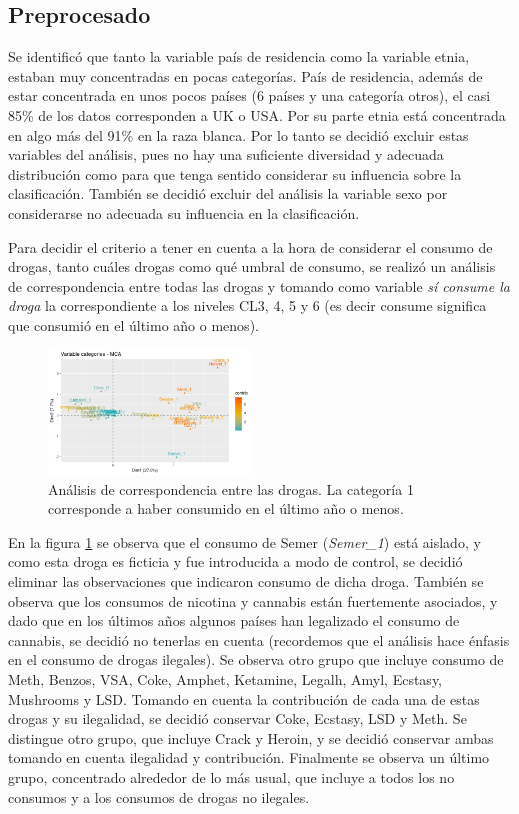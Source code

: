 \documentclass[a4paper,twocolumn]{article}
\begin{document}
\subsection{Preprocesado}
Se identificó que tanto la variable país de residencia como la variable etnia, estaban muy concentradas en pocas categorías. País de residencia, además de estar concentrada en unos pocos países (6 países y una categoría otros), el casi 85\% de los datos corresponden a UK o USA. Por su parte etnia está concentrada en algo más del 91\% en la raza blanca. Por lo tanto se decidió excluir estas variables del análisis, pues no hay una suficiente diversidad y adecuada distribución como para que tenga sentido considerar su influencia sobre la clasificación. También se decidió excluir del análisis la variable sexo por considerarse no adecuada su influencia en la clasificación.

Para decidir el criterio a tener en cuenta a la hora de considerar el consumo de drogas, tanto cuáles drogas como qué umbral de consumo, se realizó un análisis de correspondencia entre todas las drogas y tomando como variable \emph{sí consume la droga} la correspondiente a los niveles CL3, 4, 5 y 6 (es decir consume significa que consumió en el último año o menos).

\begin{figure}[h]
	\centering
	\includegraphics[trim={0.2cm 0.2cm 0.3cm 0.7cm}, clip=true, width=0.48\textwidth]{analCorresp.png}
	\caption{Análisis de correspondencia entre las drogas. La categoría 1 corresponde a haber consumido en el último año o menos.}
	\label{fig:analCorresp}
\end{figure}

En la figura \ref{fig:analCorresp} se observa que el consumo de Semer (\emph{Semer\_1}) está aislado, y como esta droga es ficticia y fue introducida a modo de control, se decidió eliminar las observaciones que indicaron consumo de dicha droga. También se observa que los consumos de nicotina y cannabis están fuertemente asociados, y dado que en los últimos años algunos países han legalizado el consumo de cannabis, se decidió no tenerlas en cuenta (recordemos que el análisis hace énfasis en el consumo de drogas ilegales). Se observa otro grupo que incluye consumo de Meth, Benzos, VSA, Coke, Amphet, Ketamine, Legalh, Amyl, Ecstasy, Mushrooms y LSD. Tomando en cuenta la contribución de cada una de estas drogas y su ilegalidad, se decidió conservar Coke, Ecstasy, LSD y Meth. Se distingue otro grupo, que incluye Crack y Heroin, y se decidió conservar ambas tomando en cuenta ilegalidad y contribución. Finalmente se observa un último grupo, concentrado alrededor de lo más usual, que incluye a todos los no consumos y a los consumos de drogas no ilegales.
\end{document}
